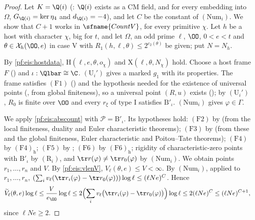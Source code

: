 \begin{proof}
Let $K=\Q(i)$ (: $\Q(i)$ exists as a CM field, and for every
embedding into $\Omega$, $G_{\Q(i)}=\ker\eta_4$ and $d_{\Q(i)}=-4$), and let $C$ be the constant of $(\mathrm{Num}_i)$. We show that
$C+1$ works in $\sfname{CountV}$, for every primitive $\chi$. Let $h$ be a host with character $\chi$, big for $t$, and let $\Omega$, an odd
prime $\ell$, $\OO$, $0<e<t$ and $\theta\in\eisX_h(\OO,e)$ in case V with $R_1(h,\ell,\theta)\le2^{c_2(\theta)}$ be given; put $N=N_h$.

By \cref{pf:eis:hostdata}, $\mathrm{H}(\ell,e,\theta,o_\chi)$ and $\mathrm{X}(\ell,\theta,N_\chi)$ hold. Choose a host frame $F$
() and $\iota:\Qlbar\cong\C$. $(\mathrm{U}_i')$ gives a marked $g_1$ with its
properties. The frame satisfies $(\mathrm{F1})$ () and the hypothesis needed for the
existence of universal points (, from global finiteness), so a universal point
$(R,u)$ exists (); by $(\mathrm{U}_i')$, $R_0$ is finite over $\OO$ and every $r_\xi$ of
type I satisfies $\mathrm{B}'_\iota$. $(\mathrm{Num}_i)$ gives $\varphi\in\Gamma$.

We apply \cref{pf:eis:abscount} with $\mathcal P=\mathrm{B}'_\iota$. Its hypotheses hold: $(\mathrm{F2})$ by
 (from the local finiteness, duality and Euler characteristic theorems);
$(\mathrm{F3})$ by  (from these and the global finiteness, Euler characteristic and
Poitou--Tate theorems); $(\mathrm{F4})$ by $(\mathrm{F4})_{\mathrm h}$; $(\mathrm{F5})$ by ; $(\mathrm{F6})$
by $(\mathrm{F6})_{\mathrm h}$; rigidity of characteristic-zero points with $\mathrm{B}'_\iota$ by $(\mathrm{R}_i)$, and $\tr r(\varphi)\ne\tr\eisrz(\varphi)$ by
$(\mathrm{Num}_i)$. We obtain points $r_1,\dots,r_n$ and $V$. By \cref{pf:eis:vlenV}, $V_\ell(\theta,e)\le V<\infty$. By $(\mathrm{Num}_i)$,
applied to $r_1,\dots,r_n$, $(\sum_i\eisv(\tr r_i(\varphi)-\tr\eisrz(\varphi)))\log\ell\le(\ell Ne)^C$. Hence
\[
 \eisVt_\ell(\theta,e)\log\ell\le\frac{V}{e_\OO}\log\ell\le2\Bigl(\sum_i\eisv\bigl(\tr r_i(\varphi)-\tr\eisrz(\varphi)\bigr)\Bigr)\log\ell
 \le2(\ell Ne)^C\le(\ell Ne)^{C+1},
\]
since $\ell Ne\ge2$.
\end{proof}

